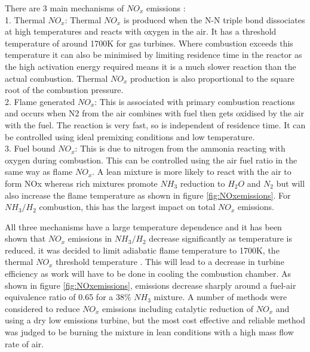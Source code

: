 There are 3 main mechanisms of $NO_x$ emissions \cite{netl}:\\ 
1. Thermal $NO_x$: Thermal $NO_x$ is produced when the N-N triple bond dissociates at high temperatures and reacts with oxygen in the air. It has a threshold temperature of around 1700K for gas turbines. Where combustion exceeds this temperature it can also be minimised by limiting residence time in the reactor as the high activation energy required means it is a much slower reaction than the actual combustion. Thermal $NO_x$ production is also proportional to the square root of the combustion pressure.
\\2. Flame generated $NO_x$: This is associated with primary combustion reactions and occurs when N2 from the air combines with fuel then gets oxidised by the air with the fuel. The reaction is very fast, so is independent of residence time. It can be controlled using ideal premixing conditions and low temperature.
\\3. Fuel bound $NO_x$: This is due to nitrogen from the ammonia reacting with oxygen during combustion. This can be controlled using the air fuel ratio in the same way as flame $NO_x$. A lean mixture is more likely to react with the air to form NOx whereas rich mixtures promote $NH_3$ reduction to $H_2O$ and $N_2$ but will also increase the flame temperature as shown in figure \ref{fig:NOxemissions}. For $NH_3/H_2$ combustion, this has the largest impact on total $NO_x$ emissions. \cite{junLi}
  
All three mechanisms have a large temperature dependence and it has been shown that $NO_x$ emissions in $NH_3/H_2$ decrease significantly as temperature is reduced. it was decided to limit adiabatic flame temperature to 1700K, the thermal $NO_x$ threshold temperature \cite{netl}. This will lead to a decrease in turbine efficiency as work will have to be done in cooling the combustion chamber. As shown in figure \ref{fig:NOxemissions}, emissions decrease sharply around a fuel-air equivalence ratio of 0.65 for a $38\%$ $NH_3$ mixture. A number of methods were considered to reduce $NO_x$ emissions including catalytic reduction of $NO_x$ and using a dry low emissions turbine, but the most cost effective and reliable method was judged to be burning the mixture in lean conditions with a high mass flow rate of air.

